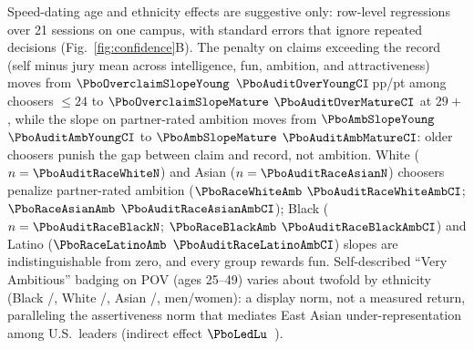 Speed-dating age and ethnicity effects are suggestive only: row-level regressions over 21 sessions on one campus, with standard errors that ignore repeated decisions (Fig.~\ref{fig:confidence}B). The penalty on claims exceeding the record (self minus jury mean across intelligence, fun, ambition, and attractiveness) moves from $\PboOverclaimSlopeYoung$ $\PboAuditOverYoungCI$\,pp/pt among choosers $\le 24$ to $\PboOverclaimSlopeMature$ $\PboAuditOverMatureCI$ at $29+$, while the slope on partner-rated ambition moves from $\PboAmbSlopeYoung$ $\PboAuditAmbYoungCI$ to $\PboAmbSlopeMature$ $\PboAuditAmbMatureCI$: older choosers punish the gap between claim and record, not ambition. White ($n=\PboAuditRaceWhiteN$) and Asian ($n=\PboAuditRaceAsianN$) choosers penalize partner-rated ambition ($\PboRaceWhiteAmb$ $\PboAuditRaceWhiteAmbCI$; $\PboRaceAsianAmb$ $\PboAuditRaceAsianAmbCI$); Black ($n=\PboAuditRaceBlackN$; $\PboRaceBlackAmb$ $\PboAuditRaceBlackAmbCI$) and Latino ($\PboRaceLatinoAmb$ $\PboAuditRaceLatinoAmbCI$) slopes are indistinguishable from zero, and every group rewards fun. Self-described ``Very Ambitious'' badging on POV (ages 25--49) varies about twofold by ethnicity (Black \PboEthAmbBlackM{}/\PboEthAmbBlackW{}, White \PboEthAmbWhiteM{}/\PboEthAmbWhiteW{}, Asian \PboEthAmbAsianM{}/\PboEthAmbAsianW{}, men/women): a display norm, not a measured return, paralleling the assertiveness norm that mediates East Asian under-representation among U.S.\ leaders (indirect effect $\PboLedLu$~\cite{lu2020}).

